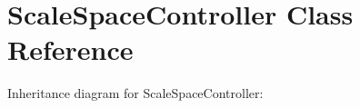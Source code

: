 \hypertarget{class_scale_space_controller}{}\section{Scale\+Space\+Controller Class Reference}
\label{class_scale_space_controller}


Inheritance diagram for Scale\+Space\+Controller\+:
